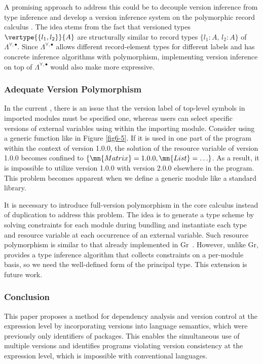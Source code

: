 A promising approach to address this could be to decouple version inference from type inference and develop a version inference system on the polymorphic record calculus \cite{10.1145/218570.218572}.
The idea stems from the fact that versioned types $\vertype{\{l_1,l_2\}}{A}$ are structurally similar to record types $\{ l_1 : A,\, l_2 : A\}$ of $\Lambda^{\forall,\bullet}$. 
Since $\Lambda^{\forall,\bullet}$ allows different record-element types for different labels and has concrete inference algorithms with polymorphism, implementing version inference on top of $\Lambda^{\forall,\bullet}$ would also make \mylang{} more expressive.


\subsubsection{Adequate Version Polymorphism}
\label{sec:fullversionpolymorphism}
In the current \mylang{}, there is an issue that the version label of top-level symbols in imported modules must be specified one, whereas users can select specific versions of external variables using \texttt{} within the importing module.
Consider using a generic function like  in Figure \ref{fig6-5}. If it is used in one part of the program within the context of  version 1.0.0, the solution of the resource variable of  version 1.0.0 becomes confined to $\{\mn{Matrix}=1.0.0,\mn{List}=\ldots\}$. As a result, it is impossible to utilize  version 1.0.0 with  version 2.0.0 elsewhere in the program. This problem becomes apparent when we define a generic module like a standard library.

It is necessary to introduce full-version polymorphism in the core calculus instead of duplication to address this problem.
The idea is to generate a type scheme by solving constraints for each module during bundling and instantiate each type and resource variable at each occurrence of an external variable.
Such resource polymorphism is similar to that already implemented in Gr~\cite{Orchard:2019:Granule}. However, unlike Gr, \vlmini{} provides a type inference algorithm that collects constraints on a per-module basis, so we need the well-defined form of the principal type. This extension is future work.

\subsubsection{Conclusion}
This paper proposes a method for dependency analysis and version control at the expression level by incorporating versions into language semantics, which were previously only identifiers of packages.
This enables the simultaneous use of multiple versions and identifies programs violating version consistency at the expression level, which is impossible with conventional languages.

